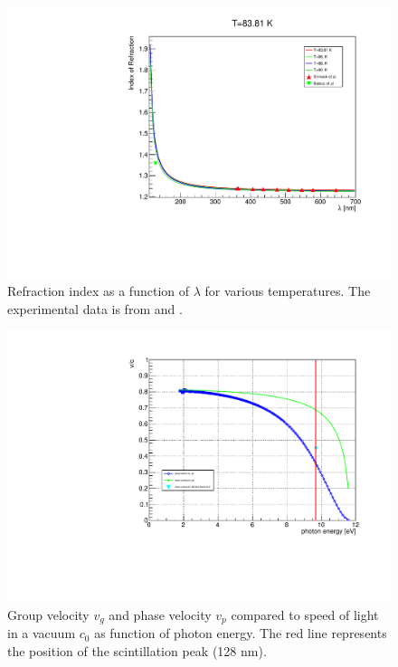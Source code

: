 \documentclass{article}
\begin{document}
\begin{figure}[ht]
\begin{center}
\includegraphics[width=35.5pc]{sellmeier.pdf}
\end{center}
\caption{\label{fig:sellmeier}Refraction index as a function of $\lambda$ for various temperatures. The experimental data is from \cite{ref:Sinnock} and \cite{ref:vg}.}
\end{figure}
\begin{figure}[ht]
\begin{center}
\includegraphics[width=35.5pc]{velocity.pdf}
\end{center}
\caption{\label{fig:vg}Group velocity $v_g$ and phase velocity $v_p$ compared to speed of light in a vacuum $c_{0}$ as function of photon energy. The red line represents the position of the scintillation peak (128 nm). }
\end{figure}
\end{document}
